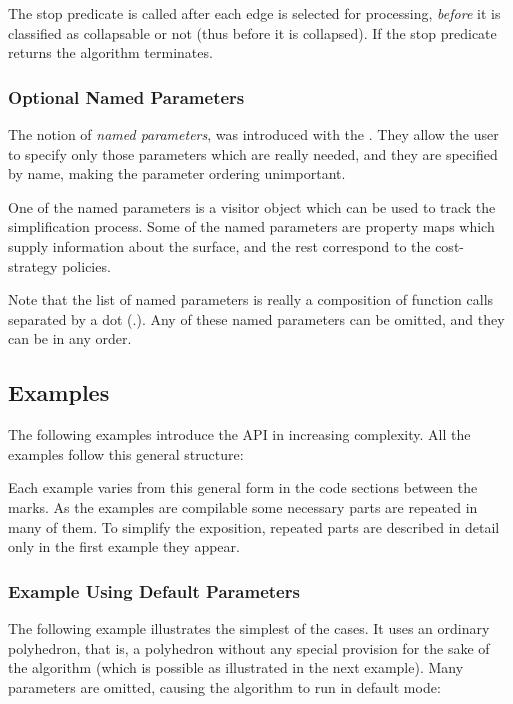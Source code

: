 The stop predicate is called after each edge is selected for processing, {\em before} 
it is classified as collapsable or not (thus before it is collapsed). If the stop predicate 
returns  the algorithm terminates.

\subsubsection{Optional Named Parameters}

The notion of {\em named parameters}, was introduced with the
.
They allow the user to specify only those parameters which are really needed,
and they are specified by name, making the parameter ordering unimportant. 

One of the named parameters is a visitor object which can be used to track the simplification 
process. Some of the named parameters are property maps which supply information about 
the surface, and the rest correspond to the cost-strategy policies. 

Note that the list of named parameters is really a composition
of function calls separated by a dot ($.$). Any of these named parameters can be omitted, 
and they can be in any order.



\subsection{Examples}

The following examples introduce the API in increasing complexity. All the examples follow 
this general structure:


Each example varies from this general form in the code sections between 
the marks. As the examples are compilable some necessary parts are repeated 
in many of them. To simplify the exposition, repeated parts are described in detail 
only in the first example they appear.

\subsubsection{Example Using Default Parameters}

The following example illustrates the simplest of the cases. It uses
an ordinary polyhedron, that is, a polyhedron without any special
provision for the sake of the algorithm (which is possible as
illustrated in the next example).  Many parameters are omitted,
causing the algorithm to run in default mode:

